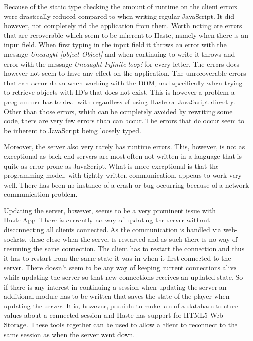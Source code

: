 \documentclass[a4paper]{article}
\begin{document}
Because of the static type checking the amount of runtime on the client errors were drastically reduced compared to when writing regular JavaScript. It did, however, not completely rid the application from them. Worth noting are errors that are recoverable which seem to be inherent to Haste, namely when there is an input field. When first typing in the input field it throws an error with the message \textit{Uncaught [object Object]} and when continuing to write it throws and error with the message \textit{Uncaught Infinite loop!} for every letter. The errors does however not seem to have any effect on the application. The unrecoverable errors that can occur do so when working with the DOM, and specifically when trying to retrieve objects with ID's that does not exist. This is however a problem a programmer has to deal with regardless of using Haste or JavaScript directly. Other than those errors, which can be completely avoided by rewriting some code, there are very few errors than can occur. The errors that do occur seem to be inherent to JavaScript being loosely typed. 

Moreover, the server also very rarely has runtime errors. This, however, is not as exceptional as back end servers are most often not written in a language that is quite as error prone as JavaScript. What is more exceptional is that the programming model, with tightly written communication, appears to work very well. There has been no instance of a crash or bug occurring because of a network communication problem. 

Updating the server, however, seems to be a very prominent issue with Haste.App. There is currently no way of updating the server without disconnecting all clients connected. As the communication is handled via web-sockets, these close when the server is restarted and as such there is no way of resuming the same connection. The client has to restart the connection and thus it has to restart from the same state it was in when it first connected to the server. There doesn't seem to be any way of keeping current connections alive while updating the server so that new connections receives an updated state. So if there is any interest in continuing a session when updating the server an additional module has to be written that saves the state of the player when updating the server. It is, however, possible to make use of a database to store values about a connected session and Haste has support for HTML5 Web Storage. These tools together can be used to allow a client to reconnect to the same session as when the server went down.
\end{document}
